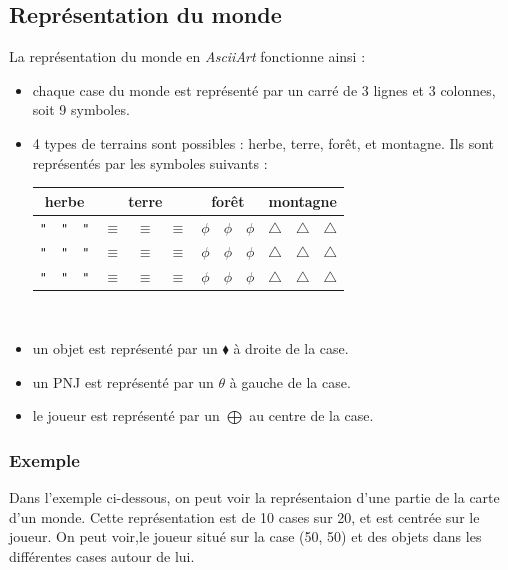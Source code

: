 \documentclass[asi]{picINSA}
\begin{document}
\subsection{Représentation du monde}
La représentation du monde en \textit{AsciiArt} fonctionne ainsi :
\begin{itemize}
\item chaque case du monde est représenté par un carré de 3 lignes et 3 colonnes, soit 9 symboles.
\item 4 types de terrains sont possibles : herbe, terre, forêt, et montagne. Ils sont représentés par les symboles suivants : \\
\begin{tabular}{| c c c | c c c | c c c | c c c | }
 \hline		
  \multicolumn{3}{|c|}{herbe} & \multicolumn{3}{|c|}{terre} & \multicolumn{3}{|c|}{forêt} & \multicolumn{3}{|c|}{montagne} \\	
\hline
    \verb+"+ & \verb+"+ & \verb+"+ & $\equiv$ & $\equiv$ & $\equiv$ & $\phi$ & $\phi$ & $\phi$ & $\triangle$ & $\triangle$ & $\triangle$ \\
    \verb+"+ & \verb+"+ & \verb+"+ & $\equiv$ & $\equiv$ & $\equiv$ & $\phi$ & $\phi$ & $\phi$ & $\triangle$ & $\triangle$ & $\triangle$ \\
    \verb+"+ & \verb+"+ & \verb+"+ & $\equiv$ & $\equiv$ & $\equiv$ & $\phi$ & $\phi$ & $\phi$ & $\triangle$ & $\triangle$ & $\triangle$ \\
 \hline  
 \end{tabular}
~\\
\item un objet est représenté par un $\blacklozenge$ à droite de la case.
\item un PNJ est représenté par un $\theta$ à gauche de la case.
\item le joueur est représenté par un $\bigoplus$ au centre de la case.
\end{itemize}

\subsubsection{Exemple}
Dans l'exemple ci-dessous, on peut voir la représentaion d'une partie de la carte d'un monde. Cette représentation est de 10 cases sur 20, et est centrée sur le joueur. On peut voir,le joueur situé sur la case (50, 50) et des objets dans les différentes cases autour de lui.
\end{document}
